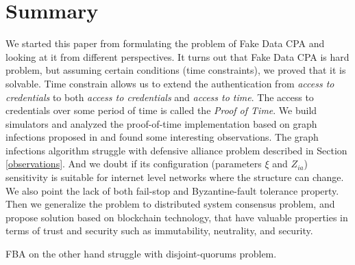 \documentclass[nostrict]{szablonPG}
\begin{document}
\section{Summary}
We started this paper from formulating the problem of Fake Data CPA and looking at it from different perspectives. It turns out that Fake Data CPA is hard problem, but assuming certain conditions (time constraints), we proved that it is solvable. Time constrain allows us to extend the authentication from \textit{access to credentials} to both \textit{access to credentials} and \textit{access to time}. The access to credentials over some period of time is called the \textit{Proof of Time}. We build simulators and analyzed the proof-of-time implementation based on graph infections proposed in \cite{jekon2019content} and found some interesting observations. The graph infections algorithm struggle with defensive alliance problem described in Section \ref{observations}. And we doubt if its configuration (parameters $\xi$ and $Z_{ia}$) sensitivity is suitable for internet level networks where the structure can change. We also point the lack of both fail-stop and Byzantine-fault tolerance property. Then we generalize the problem to distributed system consensus problem, and propose solution based on blockchain technology, that have valuable properties in terms of trust and security such as immutability, neutrality, and security. 

FBA on the other hand struggle with disjoint-quorums problem.



\end{document}
